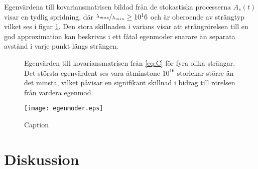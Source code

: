 Egenvärdena till kovariansmatrisen bildad från de stokastiska processerna $A_s(t)$ visar en tydlig spridning, där $\nicefrac{\lambda_{max}}{\lambda_{min}}\geq 10^16$ och är oberoende av strängtyp vilket ses i figur \ref{fig:kovegenvarde}. Den stora skillnaden i varians visar att strängrörelsen till en god approximation kan beskrivas i ett fåtal egenmoder snarare än separata avstånd i varje punkt längs strängen. 



\begin{figure}
    \centering
    
    \caption{Egenvärden till kovariansmatrisen från \eqref{eq:C} för fyra olika strängar. Det största egenvärdent ses vara åtminstone $10^{16}$ storlekar större än det minsta, vilket påvisar en signifikant skillnad i bidrag till rörelsen från vardera egenmod.}
    \label{fig:kovegenvarde}
\end{figure}



\begin{figure}
    \centering
    \texttt{[image: egenmoder.eps]}
    \caption{Caption}
    \label{fig:egenmoder}
\end{figure}





\section{Diskussion}




